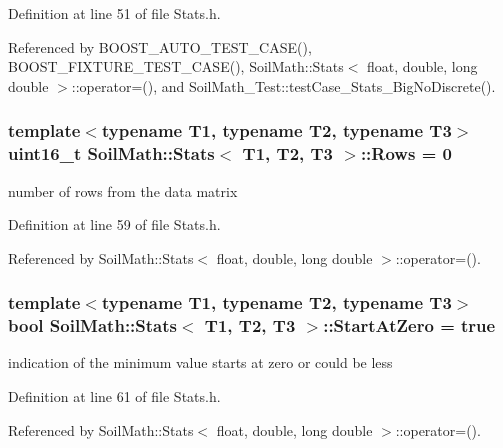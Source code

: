 Definition at line 51 of file Stats.\+h.



Referenced by B\+O\+O\+S\+T\+\_\+\+A\+U\+T\+O\+\_\+\+T\+E\+S\+T\+\_\+\+C\+A\+S\+E(), B\+O\+O\+S\+T\+\_\+\+F\+I\+X\+T\+U\+R\+E\+\_\+\+T\+E\+S\+T\+\_\+\+C\+A\+S\+E(), Soil\+Math\+::\+Stats$<$ float, double, long double $>$\+::operator=(), and Soil\+Math\+\_\+\+Test\+::test\+Case\+\_\+\+Stats\+\_\+\+Big\+No\+Discrete().

\hypertarget{class_soil_math_1_1_stats_a0e462c013f12f02e31e9ae03334151c3}{}
\subsubsection[{Rows}]{\setlength{\rightskip}{0pt plus 5cm}template$<$typename T1, typename T2, typename T3$>$ uint16\+\_\+t {\bf Soil\+Math\+::\+Stats}$<$ T1, T2, T3 $>$\+::Rows = 0}\label{class_soil_math_1_1_stats_a0e462c013f12f02e31e9ae03334151c3}
number of rows from the data matrix 

Definition at line 59 of file Stats.\+h.



Referenced by Soil\+Math\+::\+Stats$<$ float, double, long double $>$\+::operator=().

\hypertarget{class_soil_math_1_1_stats_a06f5e8404c2a0fa303dbb18a58d6deb5}{}
\subsubsection[{Start\+At\+Zero}]{\setlength{\rightskip}{0pt plus 5cm}template$<$typename T1, typename T2, typename T3$>$ bool {\bf Soil\+Math\+::\+Stats}$<$ T1, T2, T3 $>$\+::Start\+At\+Zero = true}\label{class_soil_math_1_1_stats_a06f5e8404c2a0fa303dbb18a58d6deb5}
indication of the minimum value starts at zero or could be less 

Definition at line 61 of file Stats.\+h.



Referenced by Soil\+Math\+::\+Stats$<$ float, double, long double $>$\+::operator=().

\hypertarget{class_soil_math_1_1_stats_acf54f4a105482109ebc884c8e56d0ba9}{}
